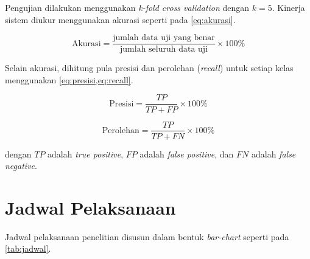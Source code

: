 Pengujian dilakukan menggunakan \textit{k-fold cross validation} dengan
$k = 5$. Kinerja sistem diukur menggunakan akurasi seperti pada
\cref{eq:akurasi}.

\begin{equation}
\mathrm{Akurasi} = \frac{\text{jumlah data uji yang benar}}{\text{jumlah seluruh data uji}} \times 100\%
\label{eq:akurasi}
\end{equation}

\noindent Selain akurasi, dihitung pula presisi dan perolehan
(\textit{recall}) untuk setiap kelas menggunakan
\cref{eq:presisi,eq:recall}.

\begin{equation}
\mathrm{Presisi} = \frac{TP}{TP+FP} \times 100\%
\label{eq:presisi}
\end{equation}

\begin{equation}
\mathrm{Perolehan} = \frac{TP}{TP+FN} \times 100\%
\label{eq:recall}
\end{equation}

\noindent dengan $TP$ adalah \textit{true positive}, $FP$ adalah
\textit{false positive}, dan $FN$ adalah \textit{false negative}.

\section{Jadwal Pelaksanaan}

Jadwal pelaksanaan penelitian disusun dalam bentuk \textit{bar-chart}
seperti pada \cref{tab:jadwal}.

